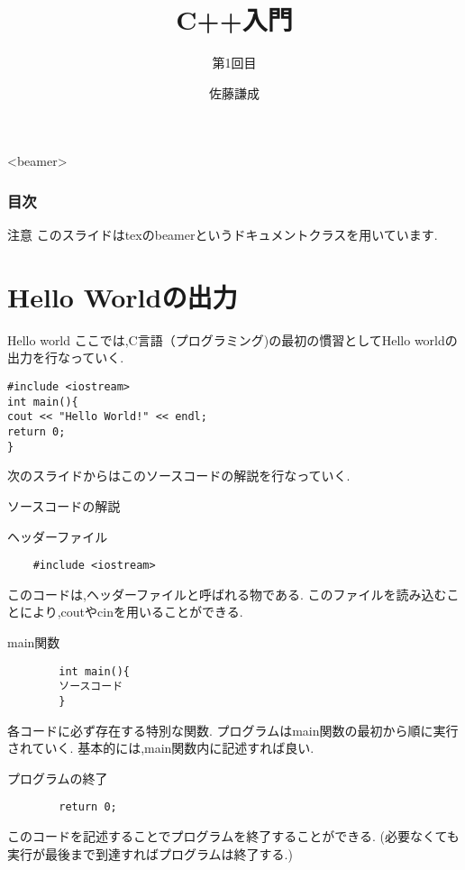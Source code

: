 \documentclass[xdvipdfmx, 8pt, t]{beamer}
\title{C++入門}
\subtitle{第1回目}
\author{佐藤謙成}
\begin{document}
\begin{frame}
    \titlepage
\end{frame}

\begin{frame}<beamer>
\frametitle{目次}
    \tableofcontents[]
\end{frame}

\begin{frame}{注意}
    このスライドはtexのbeamerというドキュメントクラスを用いています.
\end{frame}

\section{Hello Worldの出力}
\begin{frame}[fragile]{Hello world}
ここでは,C言語（プログラミング)の最初の慣習としてHello worldの出力を行なっていく.
\begin{lstlisting}[caption=Hello World, label=01]
#include <iostream>
int main(){
cout << "Hello World!" << endl;
return 0;
}
\end{lstlisting}
次のスライドからはこのソースコードの解説を行なっていく.
\end{frame}

\begin{frame}[fragile]{ソースコードの解説}
\begin{block}{ヘッダーファイル}
\begin{lstlisting}
    #include <iostream>
\end{lstlisting}
    このコードは,ヘッダーファイルと呼ばれる物である.
    このファイルを読み込むことにより,coutやcinを用いることができる.
\end{block}
\begin{block}{main関数}
    \begin{lstlisting}
        int main(){
        ソースコード
        }
    \end{lstlisting}
    各コードに必ず存在する特別な関数.
    プログラムはmain関数の最初から順に実行されていく.
    基本的には,main関数内に記述すれば良い.
\end{block}
\begin{block}{プログラムの終了}
    \begin{lstlisting}
        return 0;
    \end{lstlisting}
    このコードを記述することでプログラムを終了することができる.
    (必要なくても実行が最後まで到達すればプログラムは終了する.)
\end{block}
    
\end{frame}
\end{document}
